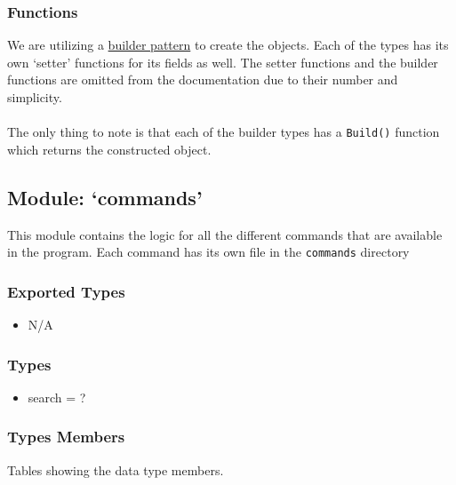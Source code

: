\documentclass[11pt]{article}
\begin{document}
\subsubsection{Functions}
We are utilizing a
\href{https://en.wikipedia.org/wiki/Builder\_pattern}{builder pattern} to
create the objects. Each of the types has its own `setter'
functions for its fields as well. The setter functions and the builder functions are omitted from the documentation
due to their number and simplicity.\\\\
The only thing to note is that each of the builder types has a \texttt{Build()} function which returns the constructed
object.

\subsection{Module: `commands'}
\label{mod:commands}
This module contains the logic for all the different commands that are available in the program. Each command has its own
file in the \texttt{commands} directory
\subsubsection{Exported Types}
\begin{itemize}
\item N/A
\end{itemize}

\subsubsection{Types}
\begin{itemize}
\item search = ?
\end{itemize}

\subsubsection{Types Members}

Tables showing the data type members.
\end{document}

